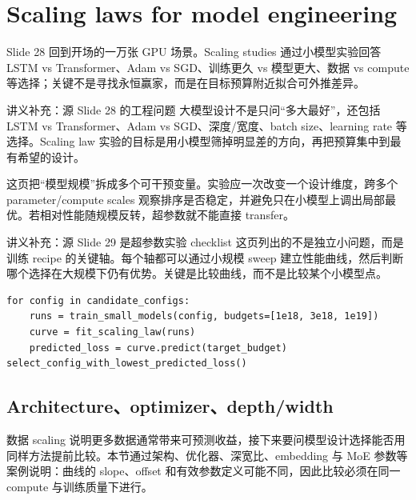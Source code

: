 \section{Scaling laws for model engineering}



Slide 28 回到开场的一万张 GPU 场景。Scaling studies 通过小模型实验回答 LSTM vs Transformer、Adam vs SGD、训练更久 vs 模型更大、数据 vs compute 等选择；关键不是寻找永恒赢家，而是在目标预算附近拟合可外推差异。

\begin{knowledgebox}{讲义补充：源 Slide 28 的工程问题}
大模型设计不是只问“多大最好”，还包括 LSTM vs Transformer、Adam vs SGD、深度/宽度、batch size、learning rate 等选择。Scaling law 实验的目标是用小模型筛掉明显差的方向，再把预算集中到最有希望的设计。
\end{knowledgebox}



这页把“模型规模”拆成多个可干预变量。实验应一次改变一个设计维度，跨多个 parameter/compute scales 观察排序是否稳定，并避免只在小模型上调出局部最优。若相对性能随规模反转，超参数就不能直接 transfer。

\begin{knowledgebox}{讲义补充：源 Slide 29 是超参数实验 checklist}
这页列出的不是独立小问题，而是训练 recipe 的关键轴。每个轴都可以通过小规模 sweep 建立性能曲线，然后判断哪个选择在大规模下仍有优势。关键是比较曲线，而不是比较某个小模型点。
\end{knowledgebox}

\begin{lstlisting}[caption={Scaling-law based design loop 的伪代码}]
for config in candidate_configs:
    runs = train_small_models(config, budgets=[1e18, 3e18, 1e19])
    curve = fit_scaling_law(runs)
    predicted_loss = curve.predict(target_budget)
select_config_with_lowest_predicted_loss()
\end{lstlisting}

\subsection{Architecture、optimizer、depth/width}

数据 scaling 说明更多数据通常带来可预测收益，接下来要问模型设计选择能否用同样方法提前比较。本节通过架构、优化器、深宽比、embedding 与 MoE 参数等案例说明：曲线的 slope、offset 和有效参数定义可能不同，因此比较必须在同一 compute 与训练质量下进行。

